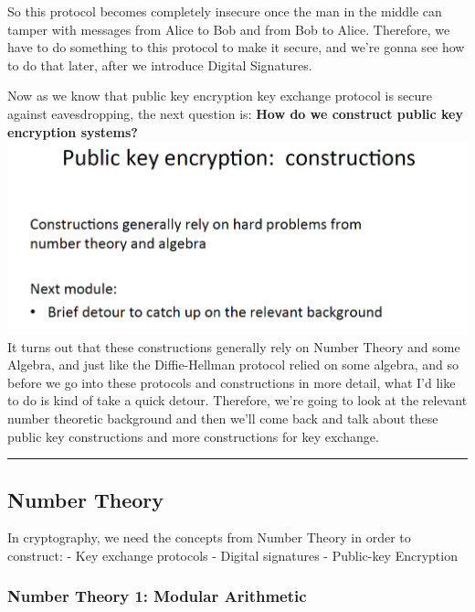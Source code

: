 \documentclass[11pt]{article}
\makeatletter
\def\maxwidth{\ifdim\Gin@nat@width>\linewidth\linewidth
    \else\Gin@nat@width\fi}
\let\Oldincludegraphics\includegraphics
\renewcommand{\includegraphics}[1]{\Oldincludegraphics[width=.8\maxwidth]{#1}}
\makeatother
\begin{document}
So this protocol becomes completely insecure once the man in the middle
can tamper with messages from Alice to Bob and from Bob to Alice.
Therefore, we have to do something to this protocol to make it secure,
and we're gonna see how to do that later, after we introduce Digital
Signatures.

Now as we know that public key encryption key exchange protocol is
secure against eavesdropping, the next question is: \textbf{How do we
construct public key encryption systems?}
\includegraphics{./Images/PKE-HowToConstruct.png} It turns out that
these constructions generally rely on Number Theory and some Algebra,
and just like the Diffie-Hellman protocol relied on some algebra, and so
before we go into these protocols and constructions in more detail, what
I'd like to do is kind of take a quick detour. Therefore, we're going to
look at the relevant number theoretic background and then we'll come
back and talk about these public key constructions and more
constructions for key exchange.

\begin{center}\rule{0.5\linewidth}{\linethickness}\end{center}

    \hypertarget{number-theory}{%
\subsection{Number Theory}\label{number-theory}}

In cryptography, we need the concepts from Number Theory in order to
construct: - Key exchange protocols - Digital signatures - Public-key
Encryption

\hypertarget{number-theory-1-modular-arithmetic}{%
\subsubsection{Number Theory 1: Modular
Arithmetic}\label{number-theory-1-modular-arithmetic}}
\end{document}
